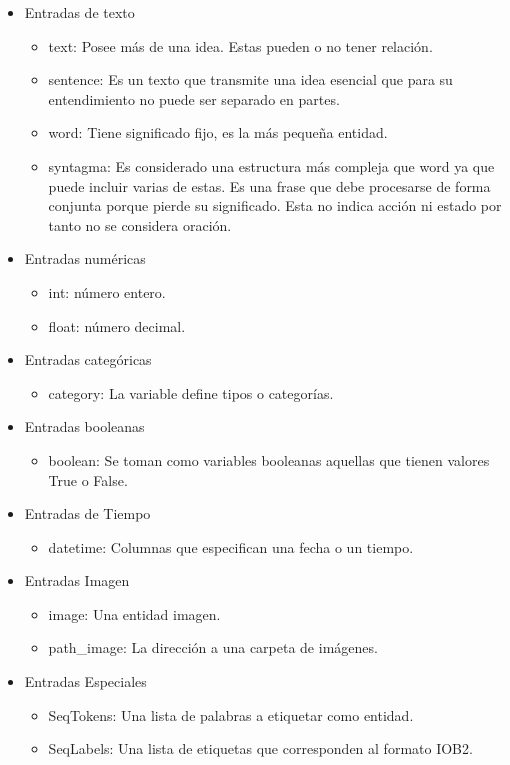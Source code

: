 \begin{itemize}
    \item Entradas de texto
    \begin{itemize}
        \item text: Posee más de una idea. Estas pueden o no tener relación.
        \item sentence: Es un texto que transmite una idea esencial que para su entendimiento no puede ser separado en partes.
        \item word: Tiene significado fijo, es la más pequeña entidad.
        \item syntagma: Es considerado una estructura más compleja que word ya que puede incluir varias de estas. Es una frase 
        que debe procesarse de forma conjunta porque pierde su significado. Esta no indica acción ni estado por tanto no se considera oración. 
    \end{itemize}      
    
    \item Entradas numéricas
    \begin{itemize}
        \item int: número entero.
        \item float: número decimal.
    \end{itemize}

    \item Entradas categóricas
    \begin{itemize}
        \item category: La variable define tipos o categorías.
    \end{itemize}
    
    \item Entradas booleanas
    \begin{itemize}
        \item boolean: Se toman como variables booleanas aquellas que tienen valores True o False.
    \end{itemize}
    
    \item Entradas de Tiempo
    \begin{itemize}
        \item datetime: Columnas que especifican una fecha o un tiempo.
    \end{itemize}
    
    \item Entradas Imagen
    \begin{itemize}
        \item image: Una entidad imagen.
        \item path\_image: La dirección a una carpeta de imágenes.
    \end{itemize}


    \item Entradas Especiales
    \begin{itemize}
        \item SeqTokens: Una lista de palabras a etiquetar como entidad.
        \item SeqLabels: Una lista de etiquetas que corresponden al formato IOB2. 
    \end{itemize}
\end{itemize}


